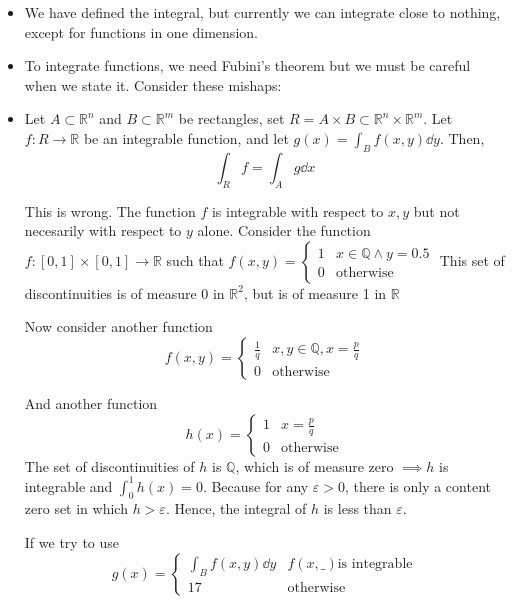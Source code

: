 \documentclass[a4paper]{article}
\numberwithin{equation}{section}
\newcommand{\R}{\mathbb{R}}
\begin{document}
\begin{itemize}
    \item We have defined the integral, but currently we can integrate close to nothing, except for functions in one dimension.
    \item To integrate functions, we need Fubini's theorem but we must be careful when we state it. Consider these mishaps:
    \item Let $A\subset\R^n$ and $B\subset\R^m$ be rectangles, set $R=A\times B\subset\R^n\times\R^m$. Let $f:R\to\R$ be an integrable function, and let $g(x)=\int_B f(x,y)\dd y$. Then,\begin{equation}
        \int_Rf=\int_Ag\dd x
    \end{equation}

    This is wrong. The function $f$ is integrable with respect to $x,y$ but not necesarily with respect to $y$ alone. Consider the function $f:[0,1]\times[0,1]\to \R$ such that $f(x,y)=\begin{cases}
        1 & x\in\mathbb Q\land y=0.5\\
        0 & \text{otherwise}
    \end{cases}$
    This set of discontinuities is of measure 0 in $\R^2$, but is of measure 1 in $\R$ 

    Now consider another function \begin{equation}
        f(x,y)=\begin{cases}
            \frac{1}{q} & x,y\in\mathbb Q, x=\frac{p}{q}\\
            0 & \text{otherwise}
        \end{cases}
    \end{equation}

    And another function \begin{equation}
        h(x)=\begin{cases}
            1 & x=\frac{p}{q}\\
            0 & \text{otherwise}
        \end{cases}
    \end{equation}
    The set of discontinuities of $h$ is $\mathbb Q$, which is of measure zero $\implies h$ is integrable and $\int_0^1h(x)=0$. Because for any $\varepsilon>0$, there is only a content zero set in which $h>\varepsilon$. Hence, the integral of $h$ is less than $\varepsilon$.

    If we try to use
    \begin{equation}
        g(x)=\begin{cases}
            \int_Bf(x,y)\dd y & f(x,\_) \text{is integrable}\\
            17 & \text{otherwise}
        \end{cases}
    \end{equation}


\end{itemize}
\end{document}
